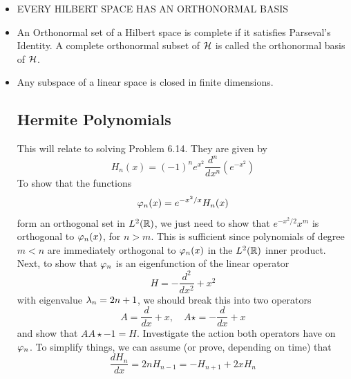 \begin{itemize}
\item EVERY HILBERT SPACE HAS AN ORTHONORMAL BASIS



\item An Orthonormal set of a Hilbert space is complete if it satisfies Parseval's Identity. A complete orthonormal subset of $\mathcal{H}$ is called the orthonormal basis of $\mathcal{H}$.

\item Any subspace of a linear space is closed in finite dimensions.

\subsection{Hermite Polynomials}
This will relate to solving Problem 6.14. They are given by
\[H_n(x) = (-1)^n e^{x^2} \frac{d^n}{dx^n}\left(e^{-x^2}\right)\]
To show that the functions 
\[\varphi_n(x) = e^{-x^2/x}H_n(x)\]
form an orthogonal set in $L^2(\mathbb{R})$, we just need to show that $e^{-x^2/2}x^m$ is orthogonal to $\varphi_n(x)$, for $n > m$. This is sufficient since polynomials of degree $m < n$ are immediately orthogonal to $\varphi_n(x)$ in the $L^2(\mathbb{R})$ inner product. Next, to show that $\varphi_n$ is an eigenfunction of the linear operator 
\[H = -\frac{d^2}{dx^2} + x^2\]
with eigenvalue $\mathrm{\lambda}_n = 2n+1$, we should break this into two operators
\[A = \frac{d}{dx} + x, \quad A\star = -\frac{d}{dx} + x\]
and show that $AA\star - 1 = H$. Investigate the action both operators have on $\varphi_n$. To simplify things, we can assume (or prove, depending on time) that 
\[\frac{dH_n}{dx} = 2nH_{n-1} = -H_{n+1} + 2xH_n\]

\end{itemize}

